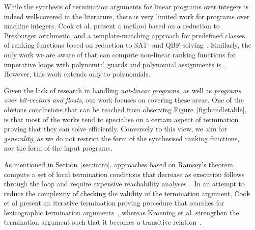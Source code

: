 \documentclass[preprint]{sigplanconf}
\theoremstyle{definition}
\begin{document}

While the synthesis of termination arguments for linear programs over
integers is indeed well-covered in the literature, there is very limited
work for programs over machine integers.  Cook et al.  present a method
based on a reduction to Presburger arithmetic, and a template-matching
approach for predefined classes of ranking functions based on reduction to
SAT- and QBF-solving~\cite{DBLP:conf/tacas/CookKRW10}.  Similarly, the only
work we are aware of that can compute non-linear ranking functions for
imperative loops with polynomial guards and polynomial assignments
is~\cite{DBLP:conf/vmcai/BradleyMS05}.  However, this work extends only to
polynomials.

Given the lack of research in handling \emph{not-linear programs}, as well
as \emph{programs over bit-vectors and floats}, our work focuses on covering
these areas.  One of the obvious conclusions that can be reached from
observing Figure~\ref{fig:handletable}, is that most of the works tend to
specialise on a certain aspect of termination proving that they can solve
efficiently.  Conversely to this view, we aim for \emph{generality}, as we
do not restrict the form of the synthesised ranking functions, nor the form
of the input programs.

As mentioned in Section~\ref{sec:intro}, approaches based on Ramsey's
theorem compute a set of local termination conditions that decrease as
execution follows through the loop and require expensive reachability
analyses~\cite{DBLP:conf/lpe/CodishG03,DBLP:conf/lics/PodelskiR04,DBLP:conf/pldi/CookPR06}. 
In an attempt to reduce the complexity of checking the validity of the
termination argument, Cook et al present an iterative termination proving
procedure that searches for lexicographic termination
arguments~\cite{DBLP:conf/tacas/CookSZ13}, whereas Kroening et al. 
strengthen the termination argument such that it becomes a transitive
relation~\cite{DBLP:conf/cav/KroeningSTW10}.
\end{document}
